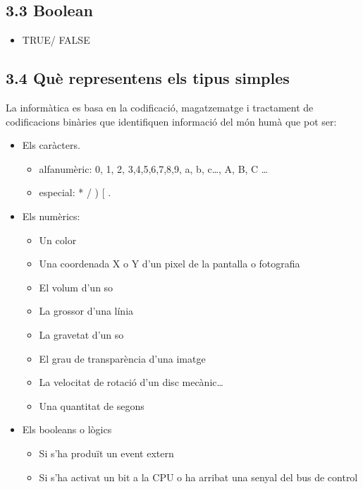 \documentclass[
  12 pt,
  a4paper,
]{article}
\providecommand{\tightlist}{%
  \setlength{\itemsep}{0pt}\setlength{\parskip}{0pt}}
\begin{document}
\subsection{3.3 Boolean}\label{boolean}

\begin{itemize}
\tightlist
\item
  TRUE/ FALSE
\end{itemize}

\subsection{3.4 Què representens els tipus
simples}\label{quuxe8-representens-els-tipus-simples}

La informàtica es basa en la codificació, magatzematge i tractament de
codificacions binàries que identifiquen informació del món humà que pot
ser:

\begin{itemize}
\item
  Els caràcters.

  \begin{itemize}
  \item
    alfanumèric: 0, 1, 2, 3,4,5,6,7,8,9, a, b, c\ldots, A, B, C \ldots{}
  \item
    especial: * / ) {[} .
  \end{itemize}
\item
  Els numèrics:

  \begin{itemize}
  \tightlist
  \item
    Un color
  \item
    Una coordenada X o Y d'un pixel de la pantalla o fotografia
  \item
    El volum d'un so
  \item
    La grossor d'una línia
  \item
    La gravetat d'un so
  \item
    El grau de transparència d'una imatge
  \item
    La velocitat de rotació d'un disc mecànic\ldots{}
  \item
    Una quantitat de segons
  \end{itemize}
\item
  Els booleans o lògics

  \begin{itemize}
  \tightlist
  \item
    Si s'ha produït un event extern
  \item
    Si s'ha activat un bit a la CPU o ha arribat una senyal del bus de
    control
  \end{itemize}
\end{itemize}
\end{document}
